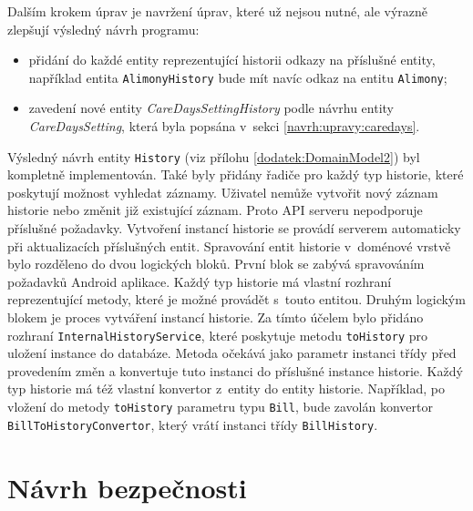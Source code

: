         Dalším krokem úprav je navržení úprav, které už nejsou nutné, ale výrazně zlepšují výsledný návrh programu:
        \begin{itemize}
            \setlength\itemsep{0.3em}
            \item přidání do každé entity reprezentující historii odkazy na příslušné entity, například entita \texttt{AlimonyHistory} bude mít navíc odkaz na entitu \texttt{Alimony};
            \item zavedení nové entity \textit{CareDaysSettingHistory} podle návrhu entity \textit{CareDaysSetting}, která byla popsána v~sekci \ref{navrh:upravy:caredays}.
        \end{itemize}
        Výsledný návrh entity \verb|History| (viz přílohu \ref{dodatek:DomainModel2}) byl kompletně implementován. Také byly přidány řadiče pro každý typ historie, které poskytují možnost vyhledat záznamy. Uživatel nemůže vytvořit nový záznam historie nebo změnit již existující záznam. Proto API serveru nepodporuje příslušné požadavky. Vytvoření instancí historie se provádí serverem automaticky při aktualizacích příslušných entit.
        Spravování entit historie v~doménové vrstvě bylo rozděleno do dvou logických bloků. První blok se zabývá spravováním požadavků Android aplikace. Každý typ historie má vlastní rozhraní reprezentující metody, které je možné provádět s~touto entitou. Druhým logickým blokem je proces vytváření instancí historie. Za tímto účelem bylo přidáno rozhraní \verb|InternalHistoryService|, které poskytuje metodu \verb|toHistory| pro uložení instance do databáze.
        Metoda očekává jako parametr instanci třídy před provedením změn a konvertuje tuto instanci do příslušné instance historie. Každý typ historie má též vlastní konvertor z~entity do entity historie. Například, po vložení do metody \verb|toHistory| parametru typu \verb|Bill|, bude zavolán konvertor \verb|BillToHistoryConvertor|, který vrátí instanci třídy \verb|BillHistory|. 

\section{Návrh bezpečnosti}\label{navrh:bezpecnost}
